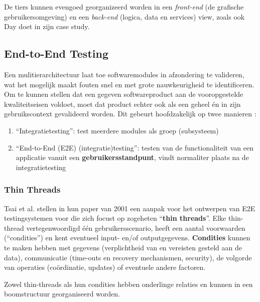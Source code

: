 De tiers kunnen evengoed georganizeerd worden in een \emph{front-end} (de grafische gebruikersomgeving) en een \emph{back-end} (logica, data en services) view, zoals ook Day doet in zijn case study.

\subsection{End-to-End Testing}

Een mulitierarchitectuur laat toe softwaremodules in afzondering te valideren, wat het mogelijk maakt fouten snel en met grote nauwkeurigheid te identificeren. Om te kunnen stellen dat een gegeven softwareproduct aan de vooropgestelde kwaliteitseisen voldoet, moet dat product echter ook als een geheel én in zijn gebruikscontext gevalideerd worden. Dit gebeurt hoofdzakelijk op twee manieren \autocite{Tsai2001}:

\begin{enumerate}
    \item ``Integratietesting'': test meerdere modules als groep (subsysteem) 
    \item ``End-to-End (E2E) (integratie)testing'': testen van de functionaliteit van een applicatie vanuit een \textbf{gebruikersstandpunt}, vindt normaliter plaats na de integratietesting
\end{enumerate}

\subsubsection{Thin Threads}

Tsai et al. stellen in hun paper van 2001 een aanpak voor het ontwerpen van E2E testingsystemen voor die zich focust op zogeheten ``\textbf{thin threads}''. Elke thin-thread vertegenwoordigd één gebruikersscenario, heeft een aantal voorwaarden (``condities'') en kent eventueel input- en/of outputgegevens. \textbf{Condities} kunnen te maken hebben met gegevens (verplichtheid van en vereisten gesteld aan de data), communicatie (time-outs en recovery mechanismen, security), de volgorde van operaties (coördinatie, updates) of eventuele andere factoren.

Zowel thin-threads als hun condities hebben onderlinge relaties en kunnen in een boomstructuur georganiseerd worden.

